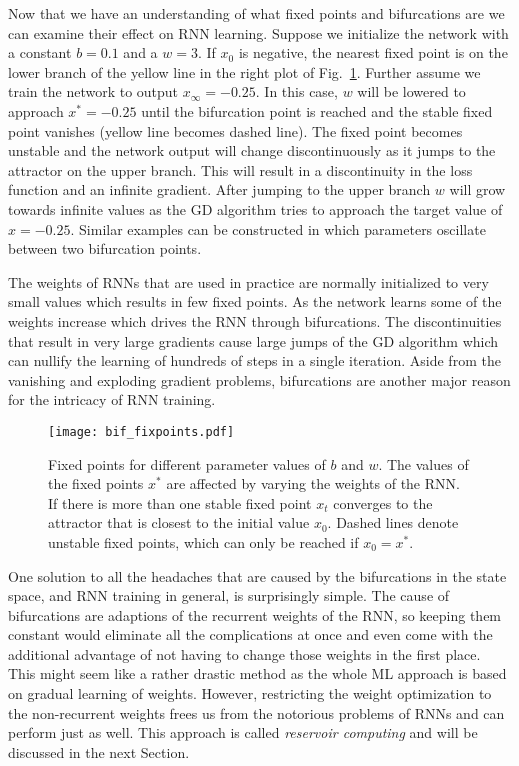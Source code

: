 Now that we have an understanding of what fixed points and bifurcations are we
can examine their effect on RNN learning. Suppose we initialize the network
with a constant $b=0.1$ and a $w=3$. If $x_0$ is negative, the nearest fixed
point is on the lower branch of the yellow line in the right plot of
Fig.~\ref{fig:fixed_points}.  Further assume we train the network to output
$x_\infty = - 0.25$.  In this case, $w$ will be lowered to approach $x^*= -
0.25$ until the bifurcation point is reached and the stable fixed point
vanishes (yellow line becomes dashed line). The fixed point becomes unstable
and the network output will change discontinuously as it jumps to the attractor
on the upper branch.  This will result in a discontinuity in the loss function
and an infinite gradient.  After jumping to the upper branch $w$ will grow
towards infinite values as the GD algorithm tries to approach the target value
of $x = - 0.25$.  Similar examples can be constructed in which parameters
oscillate between two bifurcation points.

The weights of RNNs that are used in practice are normally initialized to very
small values which results
in few fixed points. As the network learns some of the weights increase which
drives the RNN through bifurcations.  The discontinuities that result in very
large gradients cause large jumps of the GD algorithm which can nullify the
learning of hundreds of steps in a single iteration. Aside from the vanishing
and exploding gradient problems, bifurcations are another major reason for the
intricacy of RNN training.

\begin{figure}
  \texttt{[image: bif\_fixpoints.pdf]}
  \caption{Fixed points for different parameter values of $b$ and $w$.  The
    values of the fixed points $x^*$ are affected by varying the weights of the
    RNN.  If there is more than one stable fixed point $x_t$ converges to the
    attractor that is closest to the initial value $x_0$.  Dashed lines denote
    unstable fixed points, which can only be reached if $x_0 = x^*$.}
  \label{fig:fixed_points}
\end{figure}

One solution to all the headaches that are caused by the bifurcations in the
state space, and RNN training in general, is surprisingly simple.  The cause of
bifurcations are adaptions of the recurrent weights of the RNN, so keeping them
constant would eliminate all the complications at once and even come with the
additional advantage of not having to change those weights in the first place.
This might seem like a rather drastic method as the whole ML approach is based on
gradual learning of weights. However, restricting the weight optimization to the
non-recurrent weights frees us from the notorious problems of RNNs and can
perform just as well.  This approach is called \emph{reservoir computing} and
will be discussed in the next Section.

